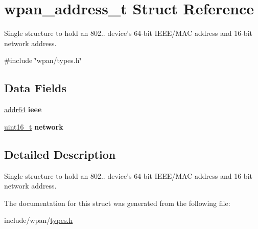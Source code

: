 \hypertarget{structwpan__address__t}{\section{wpan\-\_\-address\-\_\-t Struct Reference}
\label{structwpan__address__t}
}


Single structure to hold an 802.. device's 64-\/bit I\-E\-E\-E/\-M\-A\-C address and 16-\/bit network address.  




{\ttfamily \#include \char`\"{}wpan/types.\-h\char`\"{}}

\subsection*{Data Fields}
\begin{DoxyCompactItemize}
\item 
\hypertarget{group__wpan__types_ga57d831abe873357609a3fce445ac09c0}{\hyperlink{unionaddr64}{addr64} {\bfseries ieee}}\label{group__wpan__types_ga57d831abe873357609a3fce445ac09c0}

\item 
\hypertarget{group__wpan__types_ga8389ac73067c5366c166e34801bf95c4}{\hyperlink{group__hal_ga5a8b2dc9e45a9ee81a94ef304fb62505}{uint16\-\_\-t} {\bfseries network}}\label{group__wpan__types_ga8389ac73067c5366c166e34801bf95c4}

\end{DoxyCompactItemize}


\subsection{Detailed Description}
Single structure to hold an 802.. device's 64-\/bit I\-E\-E\-E/\-M\-A\-C address and 16-\/bit network address. 



The documentation for this struct was generated from the following file\-:\begin{DoxyCompactItemize}
\item 
include/wpan/\hyperlink{types_8h}{types.\-h}\end{DoxyCompactItemize}
